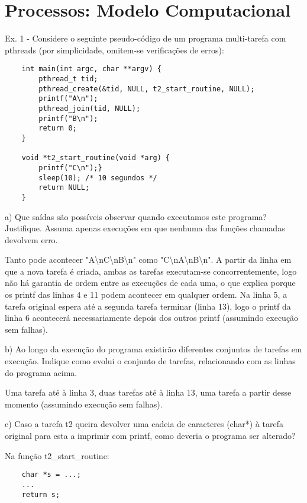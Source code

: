 \documentclass[11pt]{article}
\begin{document}
\setcounter{section}{2}

\section{Processos: Modelo Computacional}

Ex. 1 - Considere o seguinte pseudo-código de um programa multi-tarefa com pthreads (por simplicidade, omitem-se verificações de erros):

\begin{lstlisting}
    int main(int argc, char **argv) {
        pthread_t tid;
        pthread_create(&tid, NULL, t2_start_routine, NULL);
        printf("A\n");
        pthread_join(tid, NULL);
        printf("B\n");
        return 0;
    }

    void *t2_start_routine(void *arg) {
        printf("C\n");}
        sleep(10); /* 10 segundos */
        return NULL;
    } 
\end{lstlisting}

a) Que saídas são possíveis observar quando executamos este programa? Justifique. Assuma apenas execuções em que nenhuma das funções chamadas devolvem erro.

Tanto pode acontecer "A\textbackslash nC\textbackslash nB\textbackslash n" como "C\textbackslash nA\textbackslash nB\textbackslash n". A partir da linha em que a nova tarefa é criada, ambas as tarefas executam-se concorrentemente, logo não há garantia de ordem entre as execuções de cada uma, o que explica porque os printf das linhas 4 e 11 podem acontecer em qualquer ordem. Na linha 5, a tarefa original espera até a segunda tarefa terminar (linha 13), logo o printf da linha 6 acontecerá necessariamente depois dos outros printf (assumindo execução sem falhas).

b) Ao longo da execução do programa existirão diferentes conjuntos de tarefas em execução. Indique como evolui o conjunto de tarefas, relacionando com as linhas do programa acima.

Uma tarefa até à linha 3, duas tarefas até à linha 13, uma tarefa a partir desse momento (assumindo execução sem falhas).

c) Caso a tarefa t2 queira devolver uma cadeia de caracteres (char*) à tarefa original para esta a imprimir com printf, como deveria o programa ser alterado?

Na função t2\_start\_routine:

\begin{lstlisting}
    char *s = ...;
    ...
    return s;
\end{lstlisting}
\end{document}
